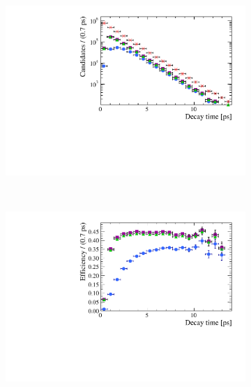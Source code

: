 \begin{figure}[htbp]
    \centering
   \begin{subfigure}[b]{0.48\textwidth}
        \includegraphics[width= \textwidth]{./Figs/LifetimeMeasurement/DT.pdf}
    \end{subfigure}
   ~ %
    \begin{subfigure}[b]{0.48\textwidth}
       \includegraphics[width=\textwidth]{./Figs/LifetimeMeasurement/Accpt.pdf}

\end{subfigure}
\end{figure}
